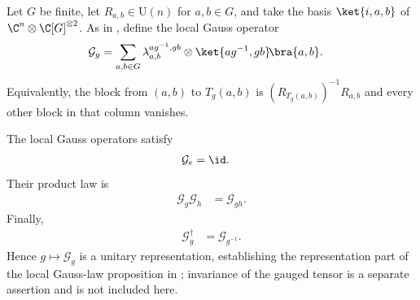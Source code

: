 \begin{definition}
    \label{def:mpug_gauss_operator}
    \leanok
    Let $G$ be finite, let $R_{a,b}\in\mathrm U(n)$ for $a,b\in G$, and take
    the basis $\ket{i,a,b}$ of $\C^n\otimes\C[G]^{\otimes2}$. As in
    \cite[lines~3380--3387]{FrancoRubio2025MPUGauging}, define the local Gauss
    operator
    \begin{align}
        \mathcal G_g
         & =\sum_{a,b\in G}
        \lambda_{a,b}^{ag^{-1},gb}
        \otimes\ket{ag^{-1},gb}\!\bra{a,b}.
        \label{eq:mpug_gauss_operator}
    \end{align}
    Equivalently, the block from $(a,b)$ to $T_g(a,b)$ is
    $(R_{T_g(a,b)})^{-1}R_{a,b}$ and every other block in that column
    vanishes.
\end{definition}

\begin{lemma}
    \label{thm:mpug_gauss_representation}
    \leanok
    The local Gauss operators satisfy
    \begin{align}
        \mathcal G_e & =\id.
    \end{align}
    Their product law is
    \begin{align}
        \mathcal G_g\mathcal G_h & =\mathcal G_{gh}.
        \label{eq:mpug_gauss_representation}
    \end{align}
    Finally,
    \begin{align}
        \mathcal G_g^\dagger & =\mathcal G_{g^{-1}}.
    \end{align}
    Hence $g\mapsto\mathcal G_g$ is a unitary representation, establishing the
    representation part of the local Gauss-law proposition in
    \cite[lines~3380--3387]{FrancoRubio2025MPUGauging}; invariance of the
    gauged tensor is a separate assertion and is not included here.
\end{lemma}

